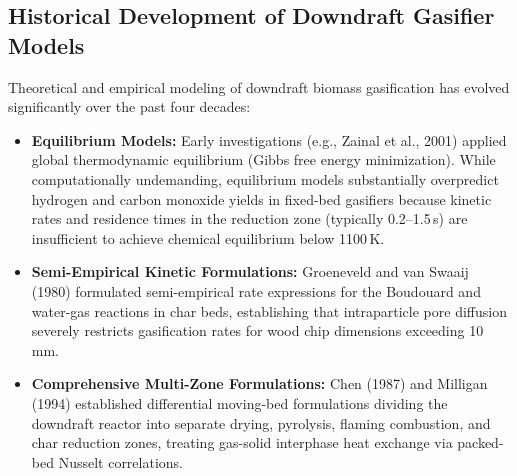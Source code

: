 \documentclass[11pt,a4paper]{article}
\begin{document}
\subsection{Historical Development of Downdraft Gasifier Models}
Theoretical and empirical modeling of downdraft biomass gasification has evolved significantly over the past four decades:
\begin{itemize}[leftmargin=1.5em]
    \item \textbf{Equilibrium Models:} Early investigations (e.g., Zainal et al., 2001) applied global thermodynamic equilibrium (Gibbs free energy minimization). While computationally undemanding, equilibrium models substantially overpredict hydrogen and carbon monoxide yields in fixed-bed gasifiers because kinetic rates and residence times in the reduction zone (typically 0.2--1.5\,s) are insufficient to achieve chemical equilibrium below 1100\,K.
    \item \textbf{Semi-Empirical Kinetic Formulations:} Groeneveld and van Swaaij (1980) formulated semi-empirical rate expressions for the Boudouard and water-gas reactions in char beds, establishing that intraparticle pore diffusion severely restricts gasification rates for wood chip dimensions exceeding 10\,mm.
    \item \textbf{Comprehensive Multi-Zone Formulations:} Chen (1987) and Milligan (1994) established differential moving-bed formulations dividing the downdraft reactor into separate drying, pyrolysis, flaming combustion, and char reduction zones, treating gas-solid interphase heat exchange via packed-bed Nusselt correlations.
\end{itemize}
\end{document}
